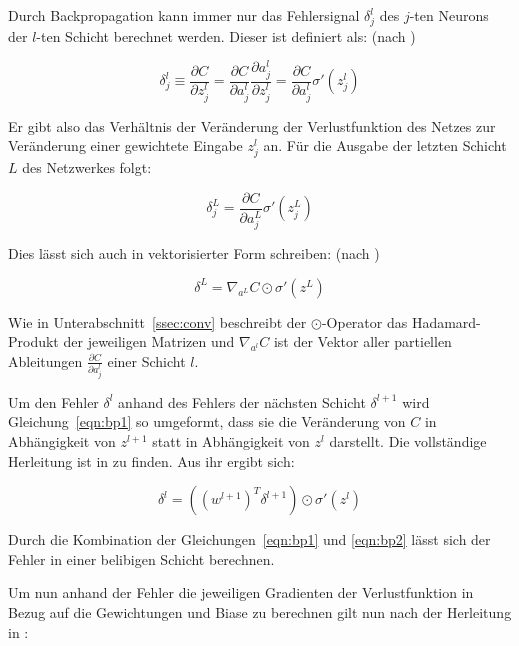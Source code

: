 Durch Backpropagation kann immer nur das Fehlersignal $\delta_j^l$ des $j$-ten Neurons der $l$-ten Schicht berechnet werden. Dieser ist definiert als: (nach \cite[Kap.~2]{nielsen_15})

\begin{equation}
\delta_j^l \equiv \frac{\partial C}{\partial z_j^l} = \frac{\partial C}{\partial a_j^l}\frac{\partial a_j^l}{\partial z_j^l} = \frac{\partial C}{\partial a_j^l}\sigma'\left(z_j^l\right)
\end{equation}

Er gibt also das Verhältnis der Veränderung der Verlustfunktion des Netzes zur Veränderung einer gewichtete Eingabe $z_j^l$ an. Für die Ausgabe der letzten Schicht $L$ des Netzwerkes folgt:

\begin{equation}
\delta_j^L = \frac{\partial C}{\partial a_j^L}\sigma'\left(z_j^L\right)
\end{equation}

Dies lässt sich auch in vektorisierter Form schreiben: (nach \cite[Kap.~2]{nielsen_15})

\begin{equation}
\label{eqn:bp1}
\delta^L = \nabla_{a^L} C\odot\sigma'\left(z^L\right)
\end{equation}

Wie in Unterabschnitt~\ref{ssec:conv} beschreibt der $\odot$-Operator das Hadamard-Produkt der jeweiligen Matrizen und $\nabla_{a^l} C$ ist der Vektor aller partiellen Ableitungen $\frac{\partial C}{\partial a_j^l}$ einer Schicht $l$.

Um den Fehler $\delta^l$  anhand des Fehlers der nächsten Schicht $\delta^{l+1}$ wird Gleichung~\ref{eqn:bp1} so umgeformt, dass sie die Veränderung von $C$ in Abhängigkeit von $z^{l+1}$ statt in Abhängigkeit von $z^{l}$ darstellt. Die vollständige Herleitung ist in \cite[Kap.~2]{kathuria_18} zu finden. Aus ihr ergibt sich:

\begin{equation}
\label{eqn:bp2}
\delta^l =\left(\left(w^{l+1}\right)^T\delta^{l+1}\right)\odot\sigma'\left(z^l\right)
\end{equation}

Durch die Kombination der Gleichungen~\ref{eqn:bp1} und \ref{eqn:bp2} lässt sich der Fehler in einer belibigen Schicht berechnen.

Um nun anhand der Fehler die jeweiligen Gradienten der Verlustfunktion in Bezug auf die Gewichtungen und Biase zu berechnen gilt nun nach der Herleitung in \cite[Kap.~2]{kathuria_18}:

